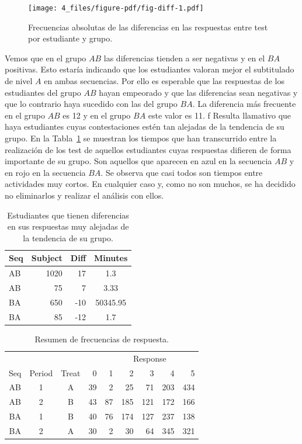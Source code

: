 \documentclass[
  12pt,
  a4paper,
  extrafontsizes,
  onecolumn,
  openright,
  table]{memoir}
\begin{document}
\begin{figure}[h]

{\centering \texttt{[image: 4\_files/figure-pdf/fig-diff-1.pdf]}

}

\caption{\label{fig-diff}Frecuencias absolutas de las diferencias en las
respuestas entre test por estudiante y grupo.}

\end{figure}

Vemos que en el grupo \(AB\) las diferencias tienden a ser negativas y
en el \(BA\) positivas. Esto estaría indicando que los estudiantes
valoran mejor el subtitulado de nivel \(A\) en ambas secuencias. Por
ello es esperable que las respuestas de los estudiantes del grupo \(AB\)
hayan empeorado y que las diferencias sean negativas y que lo contrario
haya sucedido con las del grupo \(BA\). La diferencia más frecuente en
el grupo \(AB\) es 12 y en el grupo \(BA\) este valor es 11. f Resulta
llamativo que haya estudiantes cuyas contestaciones estén tan alejadas
de la tendencia de su grupo. En la Tabla~\ref{tbl-diff} se muestran los
tiempos que han transcurrido entre la realización de los test de
aquellos estudiantes cuyas respuestas difieren de forma importante de su
grupo. Son aquellos que aparecen en azul en la secuencia \(AB\) y en
rojo en la secuencia \(BA\). Se observa que casi todos son tiempos entre
actividades muy cortos. En cualquier caso y, como no son muchos, se ha
decidido no eliminarlos y realizar el análisis con ellos.

\hypertarget{tbl-diff}{}
\begin{longtable}{lrrc}
\caption{\label{tbl-diff}Estudiantes que tienen diferencias en sus respuestas muy alejadas de la
tendencia de su grupo. }\tabularnewline

\toprule
Seq & Subject & Diff & Minutes \\ 
\midrule
AB & 1020 & 17 & 1.3 \\ 
AB & 75 & 7 & 3.33 \\ 
BA & 650 & -10 & 50345.95 \\ 
BA & 85 & -12 & 1.7 \\ 
\bottomrule
\end{longtable}

\hypertarget{tbl-resume}{}
\begin{longtable}{cccrrrrrr}
\caption{\label{tbl-resume}Resumen de frecuencias de respuesta. }\tabularnewline

\toprule
 &  &  &  & \multicolumn{5}{c}{Response} \\ 
\cmidrule(lr){5-9}
Seq & Period & Treat & 0 & 1 & 2 & 3 & 4 & 5 \\ 
\midrule
AB & 1 & A & 39 & 2 & 25 & 71 & 203 & 434 \\ 
AB & 2 & B & 43 & 87 & 185 & 121 & 172 & 166 \\ 
BA & 1 & B & 40 & 76 & 174 & 127 & 237 & 138 \\ 
BA & 2 & A & 30 & 2 & 30 & 64 & 345 & 321 \\ 
\bottomrule
\end{longtable}
\end{document}
